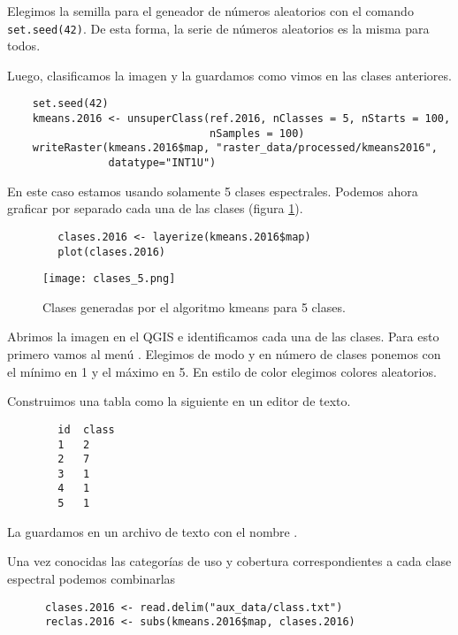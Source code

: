 \begin{exa}
    Elegimos la semilla para el geneador de n\'umeros aleatorios con el comando \texttt{set.seed(42)}. De esta forma, la serie de n\'umeros aleatorios
    es la misma para todos.

    Luego, clasificamos la imagen y la guardamos como vimos en las clases anteriores.

    \begin{lstlisting}
    set.seed(42)
    kmeans.2016 <- unsuperClass(ref.2016, nClasses = 5, nStarts = 100,
                                nSamples = 100)
    writeRaster(kmeans.2016$map, "raster_data/processed/kmeans2016",
                datatype="INT1U")
    \end{lstlisting}

    En este caso estamos usando solamente 5 clases espectrales. Podemos ahora graficar por separado cada una de las clases (figura \ref{fig:clases5}).

    \begin{lstlisting}
        clases.2016 <- layerize(kmeans.2016$map)
        plot(clases.2016)
    \end{lstlisting}

    \begin{figure}[h!]
      \centering
      \texttt{[image: clases\_5.png]}
      \caption{Clases generadas por el algoritmo kmeans para 5 clases.}
      \label{fig:clases5}
    \end{figure}

    Abrimos la imagen en el QGIS e identificamos cada una de las clases. Para esto primero vamos al men\'u . Elegimos de modo  y en n\'umero de clases ponemos con el m\'inimo en 1 y el m\'aximo en 5. En estilo de color elegimos colores aleatorios.

    Construimos una tabla como la siguiente en un editor de texto.

    \begin{verbatim}
        id  class
        1   2
        2   7
        3   1
        4   1
        5   1
    \end{verbatim}

  La guardamos en un archivo de texto con el nombre .

  Una vez conocidas las categor\'ias de uso y cobertura correspondientes a cada
  clase espectral podemos combinarlas

  \begin{lstlisting}
      clases.2016 <- read.delim("aux_data/class.txt")
      reclas.2016 <- subs(kmeans.2016$map, clases.2016)
  \end{lstlisting}


\end{exa}
